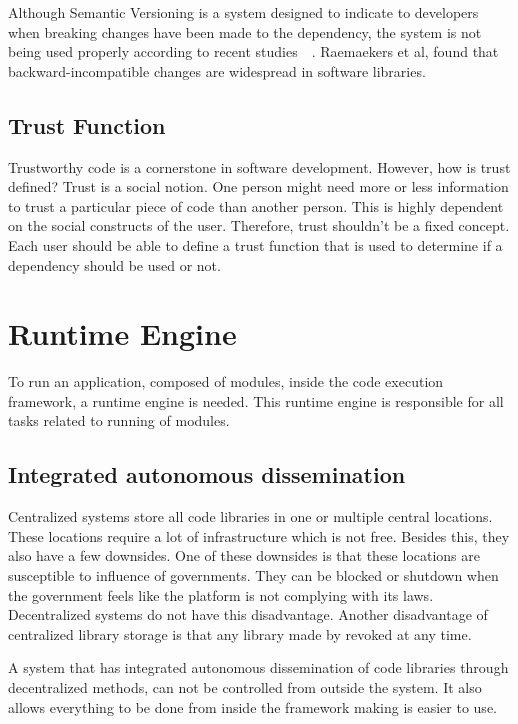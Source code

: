 Although Semantic Versioning is a system designed to indicate to developers when breaking changes have been made to the dependency, the system is not being used properly according to recent studies~\cite{raemaekers2014semantic}~\cite{raemaekers2017semantic}. Raemaekers et al, found that backward-incompatible changes are widespread in software libraries.

\subsection{Trust Function}
Trustworthy code is a cornerstone in software development. However, how is trust defined? Trust is a social notion. One person might need more or less information to trust a particular piece of code than another person. This is highly dependent on the social constructs of the user. Therefore, trust shouldn't be a fixed concept. Each user should be able to define a trust function that is used to determine if a dependency should be used or not.

\section{Runtime Engine}

To run an application, composed of modules, inside the code execution framework, a runtime engine is needed. This runtime engine is responsible for all tasks related to running of modules.

\subsection{Integrated autonomous dissemination}

Centralized systems store all code libraries in one or multiple central locations. These locations require a lot of infrastructure which is not free. Besides this, they also have a few downsides. One of these downsides is that these locations are susceptible to influence of governments. They can be blocked or shutdown when the government feels like the platform is not complying with its laws. Decentralized systems do not have this disadvantage. Another disadvantage of centralized library storage is that any library made by revoked at any time.

A system that has integrated autonomous dissemination of code libraries through decentralized methods, can not be controlled from outside the system. It also allows everything to be done from inside the framework making is easier to use.

